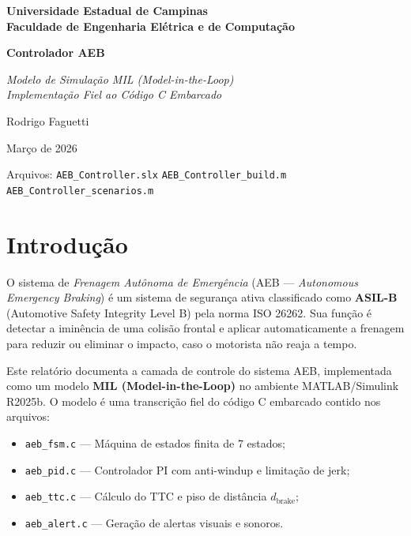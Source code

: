 \documentclass[12pt,a4paper]{article}
\begin{document}
\begin{titlepage}
    \centering
    \vspace*{2cm}
    {\Large\bfseries Universidade Estadual de Campinas\\[0.5em]
     Faculdade de Engenharia Elétrica e de Computação\par}
    \vspace{3cm}
    {\Huge\bfseries Controlador AEB\par}
    \vspace{0.5em}
    {\Large\itshape Modelo de Simulação MIL (Model-in-the-Loop)\\
     Implementação Fiel ao Código C Embarcado\par}
    \vspace{3cm}
    {\large Rodrigo Faguetti\par}
    \vspace{1em}
    {\large Março de 2026\par}
    \vfill
    {\small Arquivos: \texttt{AEB\_Controller.slx} \textbullet{}
                     \texttt{AEB\_Controller\_build.m} \textbullet{}
                     \texttt{AEB\_Controller\_scenarios.m}}
\end{titlepage}

\tableofcontents
\newpage

\section{Introdução}
\label{sec:intro}

O sistema de \emph{Frenagem Autônoma de Emergência} (AEB ---
\textit{Autonomous Emergency Braking}) é um sistema de segurança ativa
classificado como \textbf{ASIL-B} (Automotive Safety Integrity Level B) pela
norma ISO 26262. Sua função é detectar a iminência de uma colisão frontal e
aplicar automaticamente a frenagem para reduzir ou eliminar o impacto, caso
o motorista não reaja a tempo.

Este relatório documenta a camada de controle do sistema AEB, implementada
como um modelo \textbf{MIL (Model-in-the-Loop)} no ambiente MATLAB/Simulink
R2025b. O modelo é uma transcrição fiel do código C embarcado contido nos
arquivos:

\begin{itemize}[noitemsep]
    \item \texttt{aeb\_fsm.c} --- Máquina de estados finita de 7 estados;
    \item \texttt{aeb\_pid.c} --- Controlador PI com anti-windup e limitação de jerk;
    \item \texttt{aeb\_ttc.c} --- Cálculo do TTC e piso de distância $d_{\text{brake}}$;
    \item \texttt{aeb\_alert.c} --- Geração de alertas visuais e sonoros.
\end{itemize}
\end{document}
